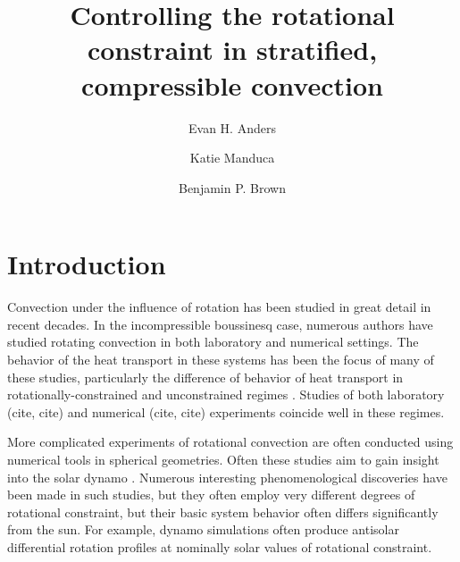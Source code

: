 \documentclass[twocolumn, amsmath, amsfonts, amssymb]{aastex62}
\begin{document}
\title{Controlling the rotational constraint in stratified, compressible convection}


\author{Evan H. Anders}
\author{Katie Manduca}
\author{Benjamin P. Brown}


\begin{abstract}
\end{abstract}


\section{Introduction}
\label{sec:intro}
Convection under the influence of rotation has been studied in great detail in
recent decades. In the incompressible boussinesq case, numerous authors have
studied rotating convection in both laboratory and numerical settings. The
behavior of the heat transport in these systems has been the focus of many
of these studies, particularly the difference of behavior of heat transport
in rotationally-constrained and unconstrained regimes 
\citep{king&all2009, zhong&all2009, stevens&all2009, julien&all2012}. 
Studies of both laboratory (cite, cite) and numerical (cite, cite) experiments
coincide well in these regimes.

More complicated experiments of rotational convection are often conducted
using numerical tools in spherical geometries. Often these studies aim to
gain insight into the solar dynamo \citep{glatzmaier&gilman1982, busse2002, brown&all2008,
brown&all2010, brown&all2011, augustson&all2012, guerrero&all2013, kapyla&all2014}.
Numerous interesting phenomenological discoveries have been made in such studies,
but they often employ very different degrees of rotational constraint, but their
basic system behavior often differs significantly from the sun. For example, 
dynamo simulations often produce antisolar differential rotation profiles at
nominally solar values of rotational constraint.
\end{document}
